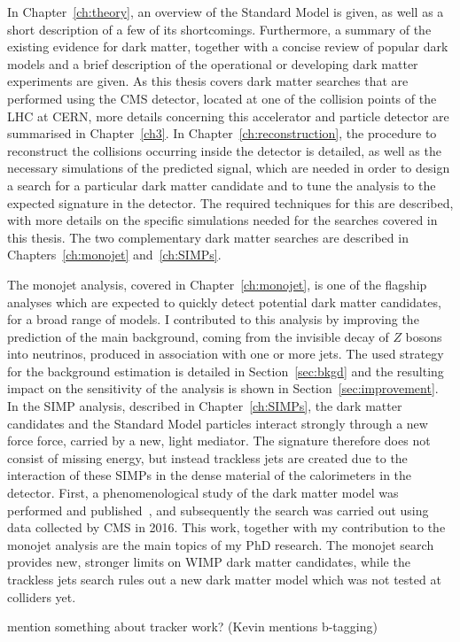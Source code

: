 In Chapter~\ref{ch:theory}, an overview of the Standard Model is given, as well as a short description of a few of its shortcomings. Furthermore, a summary of the existing evidence for dark matter, together with a concise review of popular dark models and a brief description of the operational or developing dark matter experiments are given. As this thesis covers dark matter searches that are performed using the \acs{CMS} detector, located at one of the collision points of the \acs{LHC} at \acs{CERN}, more details concerning this accelerator and particle detector are summarised in Chapter~\ref{ch3}. In Chapter~\ref{ch:reconstruction}, the procedure to reconstruct the collisions occurring inside the detector is detailed, as well as the necessary simulations of the predicted signal, which are needed in order to design a search for a particular dark matter candidate and to tune the analysis to the expected signature in the detector. The required techniques for this are described, with more details on the specific simulations needed for the searches covered in this thesis. The two complementary dark matter searches are described in Chapters~\ref{ch:monojet} and~\ref{ch:SIMPs}.

The monojet analysis, covered in Chapter~\ref{ch:monojet}, is one of the flagship analyses which are expected to quickly detect potential dark matter candidates, for a broad range of models. I contributed to this analysis by improving the prediction of the main background, coming from the invisible decay of $Z$ bosons into neutrinos, produced in association with one or more jets. The used strategy for the background estimation is detailed in Section~\ref{sec:bkgd} and the resulting impact on the sensitivity of the analysis is shown in Section~\ref{sec:improvement}. In the \ac{SIMP} analysis, described in Chapter~\ref{ch:SIMPs}, the dark matter candidates and the Standard Model particles interact strongly through a new force force, carried by a new, light mediator. The signature therefore does not consist of missing energy, but instead trackless jets are created due to the interaction of these \acsp{SIMP} in the dense material of the calorimeters in the detector. First, a phenomenological study of the dark matter model was performed and published~\cite{Daci:2015hca}, and subsequently the search was carried out using data collected by \acs{CMS} in 2016. This work, together with my contribution to the monojet analysis are the main topics of my PhD research. The monojet search provides new, stronger limits on \acs{WIMP} dark matter candidates, while the trackless jets search rules out a new dark matter model which was not tested at colliders yet.

{\color{red} mention something about tracker work? (Kevin mentions b-tagging)}


\clearpage{\pagestyle{empty}\cleardoublepage}
